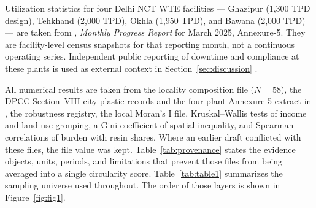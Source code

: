 \documentclass[12pt,a4paper]{article}
\begin{document}
Utilization statistics for four Delhi NCT WTE facilities --- Ghazipur (1,300 TPD design), Tehkhand (2,000 TPD), Okhla (1,950 TPD), and Bawana (2,000 TPD) --- are taken from \citet{dpcc_mpr_2025}, \emph{Monthly Progress Report} for March 2025, Annexure-5. They are facility-level census snapshots for that reporting month, not a continuous operating series. Independent public reporting of downtime and compliance at these plants is used as external context in Section~\ref{sec:discussion} \citep{ht_ghazipur_shutdown_2026,ht_cpcb_affidavit_2026}.

All numerical results are taken from the locality composition file ($N=58$), the DPCC Section~VIII city plastic records and the four-plant Annexure-5 extract in \citet{dpcc_mpr_2025}, the robustness registry, the local Moran's I file, Kruskal--Wallis tests of income and land-use grouping, a Gini coefficient of spatial inequality, and Spearman correlations of burden with resin shares. Where an earlier draft conflicted with these files, the file value was kept. Table~\ref{tab:provenance} states the evidence objects, units, periods, and limitations that prevent those files from being averaged into a single circularity score. Table~\ref{tab:table1} summarizes the sampling universe used throughout. The order of those layers is shown in Figure~\ref{fig:fig1}.
\end{document}
